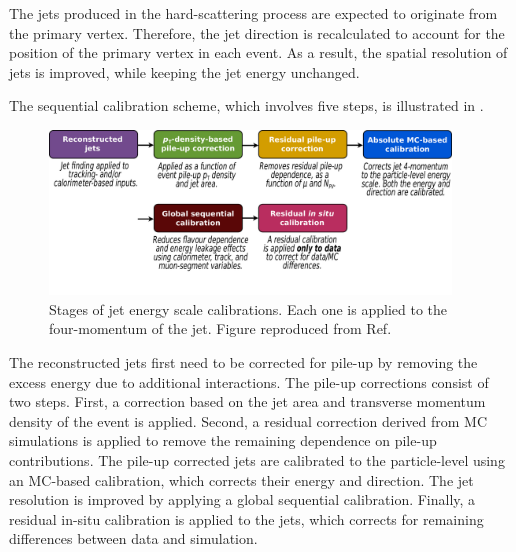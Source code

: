 The jets produced in the hard-scattering process are expected to originate from the primary vertex. Therefore, the jet direction is recalculated to account for the position of the primary vertex in each event. As a result, the spatial resolution of jets is improved, while keeping the jet energy unchanged.

The sequential calibration scheme, which involves five steps, is illustrated in .

\begin{figure}[htbp]
	\centering
	\includegraphics[width=0.95\textwidth]{figures/methods/jet_smallr_calibration.pdf}
	\caption{Stages of jet energy scale calibrations. Each one is applied to the four-momentum of the jet. Figure reproduced from Ref.~\cite{JETM-2018-05}}
	\label{fig:methods:event-reconstruction:jets:smallr:calibration}
\end{figure}

The reconstructed jets first need to be corrected for pile-up by removing the excess energy due to additional \HepProcess{\Pp\Pp} interactions. The pile-up corrections consist of two steps. First, a correction based on the jet area and transverse momentum density of the event is applied. Second, a residual correction derived from MC simulations is applied to remove the remaining dependence on pile-up contributions.
The pile-up corrected jets are calibrated to the particle-level using an MC-based calibration, which corrects their energy and direction. The jet \pt resolution is improved by applying a global sequential calibration. Finally, a residual in-situ calibration is applied to the jets, which corrects for remaining differences between data and simulation.

